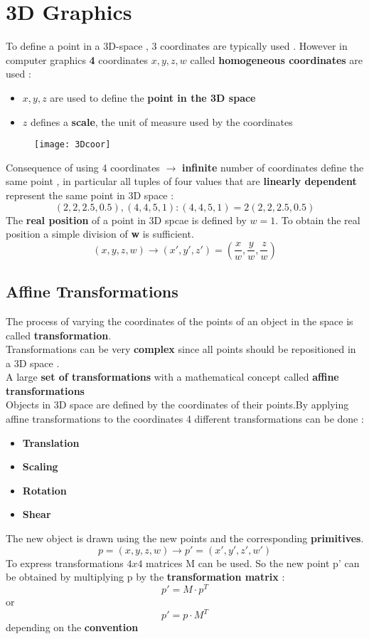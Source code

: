 \section{3D Graphics}
To define a point in a 3D-space , 3 coordinates are typically used . However in computer graphics \textbf{4} coordinates $x,y,z,w$ called \textbf{homogeneous coordinates} are used :
\begin{itemize}
\item $x,y,z$ are used to define the \textbf{point in the 3D space}
\item $z$ defines a \textbf{scale}, the unit of measure used by the coordinates
\end{itemize}
\begin{figure}[H]
\centering
  \texttt{[image: 3Dcoor]}
\end{figure}
Consequence of using 4 coordinates $\to$  \textbf{infinite} number of coordinates define the same point , in particular all tuples of four values that are \textbf{linearly dependent} represent the same point in 3D space :
$$  (2,2,2.5,0.5),(4,4,5,1) : (4,4,5,1) = 2(2,2,2.5,0.5)$$
The \textbf{real position} of a point in 3D spcae is defined by $w=1$.
To obtain the real position a simple division of \textbf{w} is sufficient.
$$ (x,y,z,w) \to (x',y',z') = (\frac{x}{w}, \frac{y}{w}, \frac{z}{w})$$

\subsection{Affine Transformations}
The process of varying the coordinates of the points  of an object in the space is called \textbf{transformation}.\\
Transformations can be very \textbf{complex} since all points should be repositioned  in a 3D space .\\A large \textbf{set of transformations} with a mathematical concept called \textbf{affine transformations}\\
Objects in 3D space are defined by the coordinates of their points.By applying affine transformations to the coordinates 4 different transformations can be done :
\begin{itemize}
\item \textbf{Translation}
\item \textbf{Scaling}
\item \textbf{Rotation}
\item \textbf{Shear}
\end{itemize}
The new object is drawn using the new points and the corresponding \textbf{primitives}.\\
$$ p=(x,y,z,w) \to p'=(x',y',z',w') $$ 
To express transformations $4x4 $ matrices M can be used. So the new point p' can be obtained by multiplying p by the \textbf{transformation matrix} :
$$ p' = M\cdot p^T $$ or $$ p' = p \cdot M^T $$
depending on the \textbf{convention}

